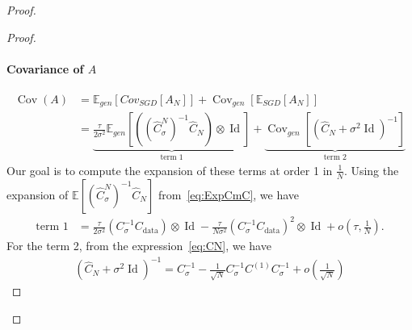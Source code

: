 \documentclass[11pt]{article}
\newcommand{\eqdef}{\coloneqq}
\newcommand{\id}{\operatorname{Id}}
\newcommand{\EE}{\mathbb{E}}
\newcommand{\cov}{\operatorname{Cov}}
\begin{document}
\begin{proof}
\begin{proof}
\paragraph{Covariance of $A$} 
\begin{align*}
    \cov(A) &= \EE_{gen}[Cov_{SGD}[A_N]] + \cov_{gen}[\EE_{SGD}[A_N]] \\
    &=  \underbrace{\frac{\tau}{2 \sigma^2}  \EE_{gen}\left[ \left( (\hat C^N_\sigma)^{-1} \hat C_N \right) \otimes \id \right]}_{\text{term 1}} + \underbrace{\cov_{gen}\left[(\hat C_N + \sigma^2\id)^{-1} \right]}_{\text{term 2}}
\end{align*}
Our goal is to compute the expansion of these terms at order 1 in $\frac{1}{N}$. %
Using the expansion of $\EE\left[ (\hat C^N_\sigma)^{-1} \hat C_N \right]$ from~\eqref{eq:ExpCmC}, we have
\begin{align*}
\text{term 1} %
&= \frac{\tau}{2 \sigma^2} \left( C_\sigma^{-1} C_\mathrm{data} \right) \otimes  \id - \frac{\tau}{N \sigma^2} \left( C_\sigma^{-1} C_\mathrm{data}\right)^2 \otimes \id + o \left(\tau, \frac{1}{N}\right) .
\end{align*}
For the term 2, from the expression~\eqref{eq:CN}, we have 
\begin{align*}
    (\hat C_N + \sigma^2\id)^{-1} = C_\sigma^{-1} - \frac{1}{\sqrt{N}}  C_\sigma^{-1} C^{(1)} C_\sigma^{-1}  + o( \frac{1}{\sqrt{N}}) 

\end{align*}
\end{proof}
\end{proof}
\end{document}
